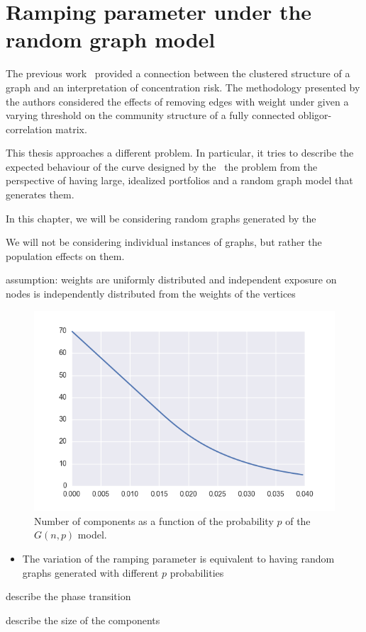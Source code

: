 \chapter{Ramping parameter under the random graph model} %
\label{cha:ramping_parameter_under_the_random_graph_model}

The previous work~\cite{Sindel:2009vd} provided a connection between the clustered structure of a graph and an interpretation of concentration risk.
The methodology presented by the authors considered the effects of removing edges with weight under given a varying threshold on the community structure of a fully connected obligor-correlation matrix.

This thesis approaches a different problem.
In particular, it tries to describe the expected behaviour of the curve designed by the~\cite{Sindel:2009vd} the problem from the perspective of having
large, idealized portfolios 
and a random graph model that generates them.


In this chapter, we will be considering random graphs generated by the 

We will not be considering individual instances of graphs, but rather the population effects on them.



assumption:
weights are uniformly distributed and independent
exposure on nodes is independently distributed from the weights of the vertices


\begin{figure}[tb]
	\centering
	\includegraphics[]{figures/gnp_number_components.png}
	\caption{Number of components as a function of the probability $p$ of the $G(n,p)$ model.}
	\label{fig:figure1}
\end{figure}


\begin{itemize}
	\item The variation of the ramping parameter is equivalent to having random graphs generated with different $p$ probabilities
\end{itemize}


describe the phase transition


describe the size of the components


